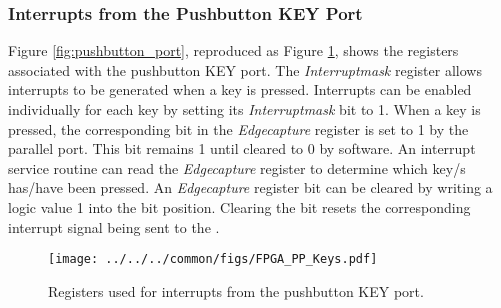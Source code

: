 \subsubsection{Interrupts from the Pushbutton KEY Port}

Figure \ref{fig:pushbutton_port}, reproduced as Figure \ref{fig:pushbutton_port_int},
shows the registers associated with the pushbutton KEY port. 
The {\it Interruptmask} register allows interrupts to be generated when a key is
pressed. Interrupts can be enabled individually for each key by setting its 
{\it Interruptmask} bit to 1.  When a key is pressed, the corresponding bit in the 
{\it Edgecapture} register is set to 1 by the parallel port. This bit remains 1
until cleared to 0 by software.  An interrupt service routine can read the {\it Edgecapture} 
register to determine which key/s has/have been pressed.  An {\it Edgecapture} register bit can 
be cleared by writing a logic value 1 into the bit position.  Clearing the
bit resets the corresponding interrupt signal being sent to the \GIC.

\begin{figure}[h!]
   \begin{center}
       \texttt{[image: ../../../common/figs/FPGA\_PP\_Keys.pdf]}
   \end{center}
   \caption{Registers used for interrupts from the pushbutton KEY port.}
	\label{fig:pushbutton_port_int}
\end{figure}

